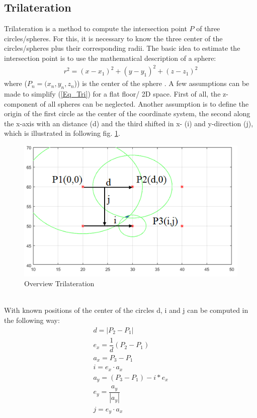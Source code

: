 \subsection{Trilateration}
Trilateration is a method to compute the intersection point $P$ of three circles/spheres. For this, it is necessary to know the three center of the circles/spheres plus their corresponding radii. The basic idea to estimate the intersection point is to use the mathematical description of a sphere:
\begin{align}\label{Eq_Tri}
r^2 = (x-x_1)^2 + (y-y_1)^2 + (z-z_1)^2  
\end{align} 
where ($P_n=(x_n,y_n,z_n$)) is the center of the sphere \cite{Cotera.2016}. A few assumptions can be made to simplify (\ref{Eq_Tri}) for a flat floor/ 2D space. First of all, the z-component of all spheres can be neglected. Another assumption is to define the origin of the first circle as the center of the coordinate system, the second along the x-axis with an distance (d) and the third shifted in x- (i) and y-direction (j), which is illustrated in following fig. \ref{Tri_1}.\\ 
\begin{figure}[!htbp]
 \centering
 \includegraphics[width = 13cm]{Pictures/Trilateration_1}
 \caption{Overview Trilateration}
 \label{Tri_1}
 \end{figure}\\ 
With known positions of the center of the circles d, i and j can be computed in the following way\cite{Cotera.2016}:
\begin{align}
d = |P_2 - P_1| \\ 
e_x = \dfrac{1}{d}(P_2 - P_1) \\
a_x = P_3 - P_1 \\
i = e_x \cdot a_x \\
a_y = (P_3 - P_1) - i * e_x \\
e_y = \dfrac{a_y}{|a_y|} \\
j = e_y \cdot a_x
\end{align}
